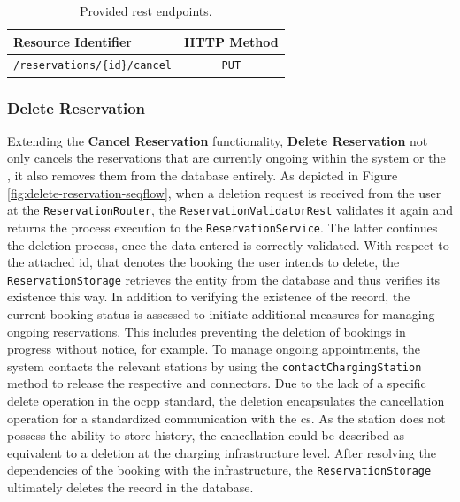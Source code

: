 \begingroup
\setlength{\tabcolsep}{10pt} %
\renewcommand{\arraystretch}{1.5} %
\begin{table}[h]
\centering
\caption{Provided \acrshort{rest} endpoints.}
    \begin{tabular}{l|c}
    Resource Identifier & HTTP Method \\ \hline
    \texttt{/reservations/\{id\}/cancel} & \texttt{PUT}
    \end{tabular}
\label{tab:cancel-reservation-rest}
\end{table}
\endgroup

\newpage

\subsubsection{Delete Reservation}
\label{ch:Implementation:sec:Reservation System:ssec:Management Capabilities:sssec:Delete Reservation}

Extending the \textbf{Cancel Reservation} functionality, \textbf{Delete Reservation} not only cancels the reservations that are currently ongoing within the system or the , it also removes them from the database entirely.
As depicted in Figure \ref{fig:delete-reservation-seqflow}, when a deletion request is received from the user at the \texttt{ReservationRouter}, the \texttt{ReservationValidatorRest} validates it again and returns the process execution to the \texttt{ReservationService}. The latter continues the deletion process, once the data entered is correctly validated.
With respect to the attached \acrshort{id}, that denotes the booking the user intends to delete, the \texttt{ReservationStorage} retrieves the entity from the database and thus verifies its existence this way.
In addition to verifying the existence of the record, the current booking status is assessed to initiate additional measures for managing ongoing reservations.
This includes preventing the deletion of bookings in progress without notice, for example. To manage ongoing appointments, the system contacts the relevant stations by using the \texttt{contactChargingStation} method to release the respective  and connectors.
Due to the lack of a specific delete operation in the \acrshort{ocpp} standard, the deletion encapsulates the cancellation operation for a standardized communication with the \acrshort{cs}. 
As the station does not possess the ability to store history, the cancellation could be described as equivalent to a deletion at the charging infrastructure level.
After resolving the dependencies of the booking with the infrastructure, the \texttt{ReservationStorage} ultimately deletes the record in the database.

